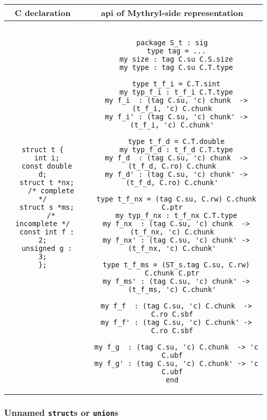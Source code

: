 \begin{small}
\begin{center}
\begin{tabular}{c|c}
C declaration & api of Mythryl-side representation \\ \hline\hline
\begin{minipage}{2in}
\begin{verbatim}
struct t {
  int i;
  const double d;
  struct t *nx;
    /* complete */
  struct s *ms;
    /* incomplete */
  const int f : 2;
  unsigned g : 3;
};
\end{verbatim}
\end{minipage}
&
\begin{minipage}{4in}
\begin{verbatim}

package S_t : sig
  type tag = ...
  my size : tag C.su C.S.size
  my type : tag C.su C.T.type

  type t_f_i = C.T.sint
  my typ_f_i : t_f_i C.T.type
  my f_i  : (tag C.su, 'c) chunk  -> (t_f_i, 'c) C.chunk
  my f_i' : (tag C.su, 'c) chunk' -> (t_f_i, 'c) C.chunk'

  type t_f_d = C.T.double
  my typ_f_d : t_f_d C.T.type
  my f_d  : (tag C.su, 'c) chunk  -> (t_f_d, C.ro) C.chunk
  my f_d' : (tag C.su, 'c) chunk' -> (t_f_d, C.ro) C.chunk'

  type t_f_nx = (tag C.su, C.rw) C.chunk C.ptr
  my typ_f_nx : t_f_nx C.T.type
  my f_nx  : (tag C.su, 'c) chunk  -> (t_f_nx, 'c) C.chunk
  my f_nx' : (tag C.su, 'c) chunk' -> (t_f_nx, 'c) C.chunk'

  type t_f_ms = (ST_s.tag C.su, C.rw) C.chunk C.ptr
  my f_ms' : (tag C.su, 'c) chunk' -> (t_f_ms, 'c) C.chunk'

  my f_f  : (tag C.su, 'c) C.chunk  -> C.ro C.sbf
  my f_f' : (tag C.su, 'c) C.chunk' -> C.ro C.sbf

  my f_g  : (tag C.su, 'c) C.chunk  -> 'c C.ubf
  my f_g' : (tag C.su, 'c) C.chunk' -> 'c C.ubf
end

\end{verbatim}
\end{minipage}
\end{tabular}
\end{center}
\end{small}

\subsubsection*{Unnamed {\tt struct}s or {\tt union}s}

